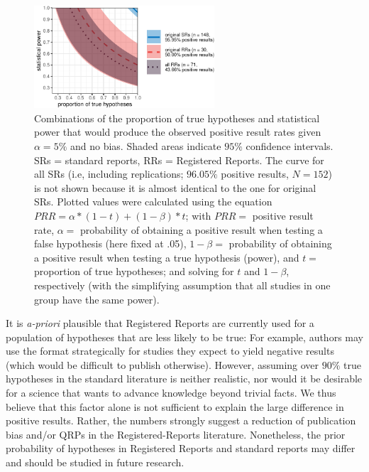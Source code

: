 \documentclass[british,,jou,floatsintext]{apa6}
\begin{document}
\begin{figure}

{\centering \includegraphics[width=0.6\textwidth]{positive_results_SRs_RRs_files/figure-latex/powerbaserate-1} 

}

\caption{Combinations of the proportion of true hypotheses and statistical power that would produce the observed positive result rates given \(\alpha = 5 \%\) and no bias. Shaded areas indicate \(95\%\) confidence intervals. SRs = standard reports, RRs = Registered Reports. The curve for all SRs (i.e, including replications; \(96.05 \%\) positive results, \(N = 152\)) is not shown because it is almost identical to the one for original SRs. Plotted values were calculated using the equation \(PRR = \alpha*(1-t) + (1-\beta)*t\); with \(PRR =\) positive result rate, \(\alpha =\) probability of obtaining a positive result when testing a false hypothesis (here fixed at .05), \(1-\beta =\) probability of obtaining a positive result when testing a true hypothesis (power), and \(t =\) proportion of true hypotheses; and solving for \(t\) and \(1-\beta\), respectively (with the simplifying assumption that all studies in one group have the same power).}\label{fig:powerbaserate}
\end{figure}

It is \emph{a-priori} plausible that Registered Reports are currently used for a population of hypotheses that are less likely to be true:
For example, authors may use the format strategically for studies they expect to yield negative results (which would be difficult to publish otherwise).
However, assuming over \(90\%\) true hypotheses in the standard literature is neither realistic, nor would it be desirable for a science that wants to advance knowledge beyond trivial facts.
We thus believe that this factor alone is not sufficient to explain the large difference in positive results.
Rather, the numbers strongly suggest a reduction of publication bias and/or QRPs in the Registered-Reports literature.
Nonetheless, the prior probability of hypotheses in Registered Reports and standard reports may differ and should be studied in future research.
\end{document}
